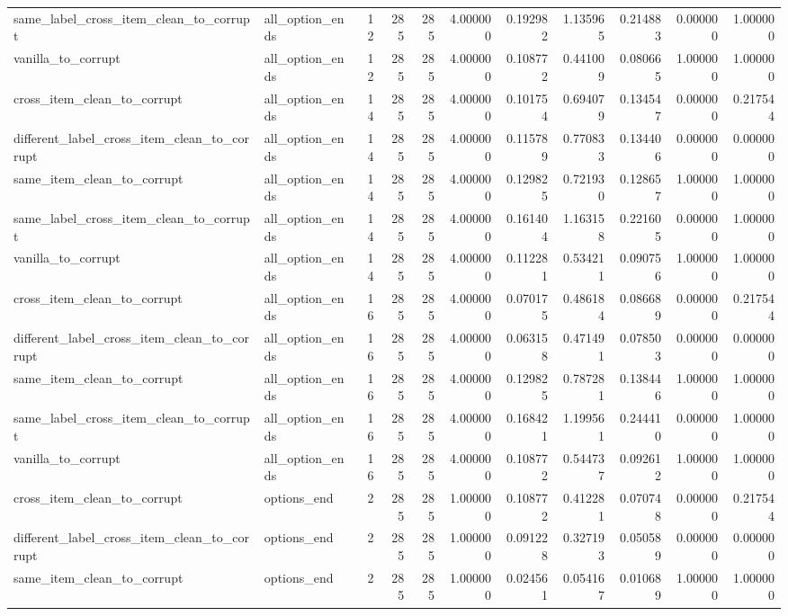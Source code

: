 \begin{tabular}{llrrrrrrrrr}
same\_label\_cross\_item\_clean\_to\_corrupt & all\_option\_ends & 12 & 285 & 285 & 4.000000 & 0.192982 & 1.135965 & 0.214883 & 0.000000 & 1.000000 \\
vanilla\_to\_corrupt & all\_option\_ends & 12 & 285 & 285 & 4.000000 & 0.108772 & 0.441009 & 0.080665 & 1.000000 & 1.000000 \\
cross\_item\_clean\_to\_corrupt & all\_option\_ends & 14 & 285 & 285 & 4.000000 & 0.101754 & 0.694079 & 0.134547 & 0.000000 & 0.217544 \\
different\_label\_cross\_item\_clean\_to\_corrupt & all\_option\_ends & 14 & 285 & 285 & 4.000000 & 0.115789 & 0.770833 & 0.134406 & 0.000000 & 0.000000 \\
same\_item\_clean\_to\_corrupt & all\_option\_ends & 14 & 285 & 285 & 4.000000 & 0.129825 & 0.721930 & 0.128657 & 1.000000 & 1.000000 \\
same\_label\_cross\_item\_clean\_to\_corrupt & all\_option\_ends & 14 & 285 & 285 & 4.000000 & 0.161404 & 1.163158 & 0.221605 & 0.000000 & 1.000000 \\
vanilla\_to\_corrupt & all\_option\_ends & 14 & 285 & 285 & 4.000000 & 0.112281 & 0.534211 & 0.090756 & 1.000000 & 1.000000 \\
cross\_item\_clean\_to\_corrupt & all\_option\_ends & 16 & 285 & 285 & 4.000000 & 0.070175 & 0.486184 & 0.086689 & 0.000000 & 0.217544 \\
different\_label\_cross\_item\_clean\_to\_corrupt & all\_option\_ends & 16 & 285 & 285 & 4.000000 & 0.063158 & 0.471491 & 0.078503 & 0.000000 & 0.000000 \\
same\_item\_clean\_to\_corrupt & all\_option\_ends & 16 & 285 & 285 & 4.000000 & 0.129825 & 0.787281 & 0.138446 & 1.000000 & 1.000000 \\
same\_label\_cross\_item\_clean\_to\_corrupt & all\_option\_ends & 16 & 285 & 285 & 4.000000 & 0.168421 & 1.199561 & 0.244410 & 0.000000 & 1.000000 \\
vanilla\_to\_corrupt & all\_option\_ends & 16 & 285 & 285 & 4.000000 & 0.108772 & 0.544737 & 0.092612 & 1.000000 & 1.000000 \\
cross\_item\_clean\_to\_corrupt & options\_end & 2 & 285 & 285 & 1.000000 & 0.108772 & 0.412281 & 0.070748 & 0.000000 & 0.217544 \\
different\_label\_cross\_item\_clean\_to\_corrupt & options\_end & 2 & 285 & 285 & 1.000000 & 0.091228 & 0.327193 & 0.050589 & 0.000000 & 0.000000 \\
same\_item\_clean\_to\_corrupt & options\_end & 2 & 285 & 285 & 1.000000 & 0.024561 & 0.054167 & 0.010689 & 1.000000 & 1.000000 \\

\end{tabular}
